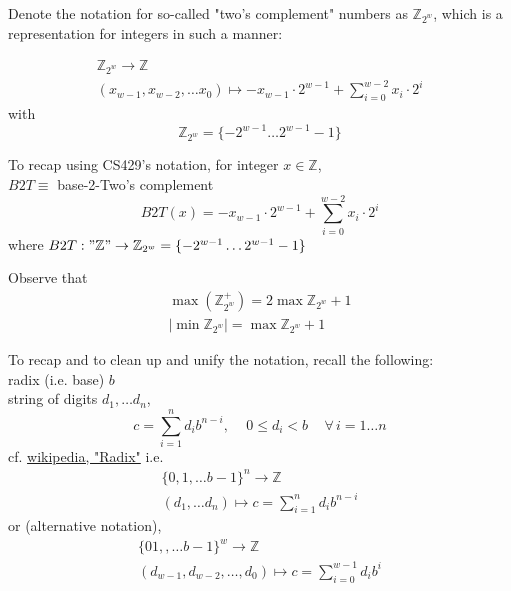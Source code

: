 \documentclass[10pt]{amsart}
\begin{document}
Denote the notation for so-called "two's complement" numbers as $\mathbb{Z}_{2^w}$, which is a representation for integers in such a manner:

\begin{equation}
\begin{gathered}
\mathbb{Z}_{2^w} \to \mathbb{Z} \\
(x_{w-1}, x_{w-2}, \dots x_0) \mapsto -x_{w-1} \cdot 2^{w-1} + \sum_{i=0}^{w-2} x_i \cdot 2^i
\end{gathered}
\end{equation}
with
\begin{equation}
\mathbb{Z}_{2^w} = \lbrace - 2^{w-1} \dots 2^{w-1} -1 \rbrace
\end{equation}

To recap using CS429's notation, for integer $x \in \mathbb{Z}$, \\
$B2T \equiv $ base-2-Two's complement \\
\[
B2T(x) = -x_{w-1} \cdot 2^{w-1} + \sum_{i=0}^{w-2} x_i \cdot 2^i
\]
where $B2T: "\mathbb{Z}" \to \mathbb{Z}_{2^w} = \lbrace -2^{w-1} \dots 2^{w-1} - 1 \rbrace$


Observe that 
\begin{equation}
\begin{gathered}
\max{ \left( \mathbb{Z}^+_{2^w} \right) } = 2 \max{ \mathbb{Z}_{2^w} } + 1 \\
| \min{ \mathbb{Z}_{2^w} } | = \max{ \mathbb{Z}_{2^w} } + 1
\end{gathered}
\end{equation}

To recap and to clean up and unify the notation, recall the following: \\
radix (i.e. base) $b$ \\
string of digits $d_1, \dots d_n$, 
\[
c = \sum_{i=1}^n d_i b^{n-i} , \quad \, 0 \leq d_i < b \quad \, \forall \, i = 1 \dots n
\]
cf. \href{https://en.wikipedia.org/wiki/Radix}{wikipedia, "Radix"}
i.e.
\[
\begin{gathered}
\lbrace 0 ,1 ,\dots b-1 \rbrace^n \to \mathbb{Z} \\ 
(d_1, \dots d_n) \mapsto c = \sum_{i=1}^n d_i b^{n-i}
\end{gathered}
\]
or (alternative notation),
\[
\begin{gathered}
\lbrace 0 1, ,\dots b-1 \rbrace^w \to \mathbb{Z} \\ 
(d_{w-1}, d_{w-2}, \dots, d_0) \mapsto c = \sum_{i=0}^{w-1} d_i b^i 
\end{gathered}
\]
\end{document}
